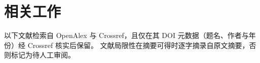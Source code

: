 \chapter{相关工作}
\label{chap:related}

以下文献检索自 OpenAlex 与 Crossref，且仅在其 DOI 元数据（题名、作者与年份）经 Crossref 核实后保留。
文献局限性在摘要可得时逐字摘录自原文摘要，否则标记为待人工审阅。


